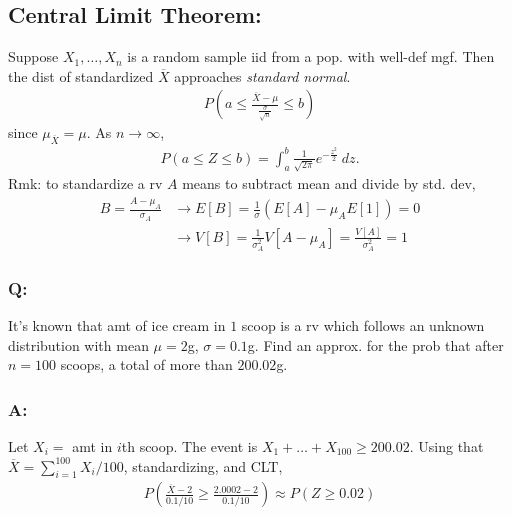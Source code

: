 \documentclass{article}
\begin{document}
\subsection*{Central Limit Theorem:}
Suppose $X_1,\dots,X_n$ is a random sample iid from a pop. with well-def mgf. Then the dist of standardized $\overline{X}$ approaches \textit{standard normal}.\newline
\begin{align*}
P\left(a \leq \frac{\overline{X}-\mu}{\frac{\sigma}{\sqrt{n}}} \leq b\right)
\end{align*}
since $\mu_{\overline{X}}=\mu$. As $n\rightarrow\infty$,
\begin{align*}
P(a \leq Z \leq b) = \int_{a}^{b}\frac{1}{\sqrt{2\pi}}e^{-\frac{z^2}{2}}\ dz.
\end{align*}
Rmk: to standardize a rv $A$ means to subtract mean and divide by std. dev,
\begin{align*}
B = \frac{A-\mu_{A}}{\sigma_{A}} &\rightarrow E[B] = \frac{1}{\sigma}(E[A]-\mu_{A}E[1]) = 0 \\
&\rightarrow V[B] = \frac{1}{\sigma_{A}^2}V[A-\mu_{A}] = \frac{V[A]}{\sigma_{A}^2} = 1
\end{align*}
\subsubsection*{Q: } It's known that amt of ice cream in $1$ scoop is a rv which follows an unknown distribution with mean $\mu=2$g, $\sigma=0.1$g. Find an approx. for the prob that after $n=100$ scoops, a total of more than $200.02$g.
\subsubsection*{A: } Let $X_i = $ amt in $i$th scoop. The event is $X_1+\dots+X_{100}\geq200.02$. Using that $\overline{X}=\sum_{i=1}^{100}X_i/100$, standardizing, and CLT,
\begin{align*}
P\left(\frac{\overline{X}-2}{0.1/10}\geq \frac{2.0002-2}{0.1/10}\right) \approx P(Z \geq 0.02)
\end{align*}
\end{document}
